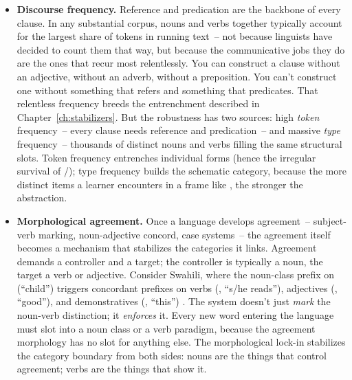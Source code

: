 \begin{itemize}
    \item \textbf{Discourse frequency.} Reference and predication are the backbone of every clause. In any substantial corpus, nouns and verbs together typically account for the largest share of tokens in running text~-- not because linguists have decided to count them that way, but because the communicative jobs they do are the ones that recur most relentlessly. You can construct a clause without an adjective, without an adverb, without a preposition. You can't construct one without something that refers and something that predicates. That relentless frequency breeds the entrenchment described in Chapter~\ref{ch:stabilizers}. But the robustness has two sources: high \emph{token} frequency~-- every clause needs reference and predication~-- and massive \emph{type} frequency~-- thousands of distinct nouns and verbs filling the same structural slots. Token frequency entrenches individual forms (hence the irregular survival of /); type frequency builds the schematic category, because the more distinct items a learner encounters in a frame like , the stronger the abstraction.
    \item \textbf{Morphological agreement.} Once a language develops agreement~-- subject-verb marking, noun-adjective concord, case systems~-- the agreement itself becomes a mechanism that stabilizes the categories it links. Agreement demands a controller and a target; the controller is typically a noun, the target a verb or adjective. Consider Swahili, where the noun-class prefix  on  (\enquote{child}) triggers concordant prefixes on verbs (, \enquote{s/he reads}), adjectives (, \enquote{good}), and demonstratives (, \enquote{this}) \citep[e.g.,][]{ashton1947}. The system doesn't just \emph{mark} the noun-verb distinction; it \emph{enforces} it. Every new word entering the language must slot into a noun class or a verb paradigm, because the agreement morphology has no slot for anything else. The morphological lock-in stabilizes the category boundary from both sides: nouns are the things that control agreement; verbs are the things that show it.

\end{itemize}
